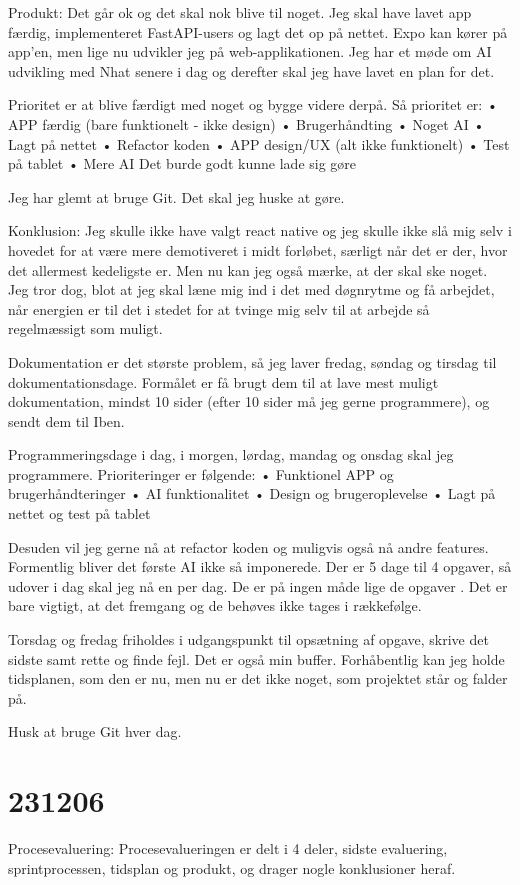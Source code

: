 \documentclass{report}
\begin{document}
Produkt:
Det går ok og det skal nok blive til noget.
Jeg skal have lavet app færdig, implementeret FastAPI-users og lagt det op på nettet.
Expo kan kører på app'en, men lige nu udvikler jeg på web-applikationen.
Jeg har et møde om AI udvikling med Nhat senere i dag og derefter skal jeg have lavet en plan for det.
 
Prioritet er at blive færdigt med noget og bygge videre derpå.
Så prioritet er:
•	APP færdig (bare funktionelt - ikke design)
•	Brugerhåndting
•	Noget AI
•	Lagt på nettet
•	Refactor koden
•	APP design/UX (alt ikke funktionelt)
•	Test på tablet
•	Mere AI
Det burde godt kunne lade sig gøre
 
Jeg har glemt at bruge Git. Det skal jeg huske at gøre.
 
Konklusion:
Jeg skulle ikke have valgt react native og jeg skulle ikke slå mig selv i hovedet for at være mere demotiveret i midt forløbet, særligt når det er der, hvor det allermest kedeligste er.
Men nu kan jeg også mærke, at der skal ske noget.
Jeg tror dog, blot at jeg skal læne mig  ind i det med døgnrytme og få arbejdet, når energien er til det i stedet for at tvinge mig selv til at arbejde så regelmæssigt som muligt.
 
Dokumentation er det største problem, så jeg laver fredag, søndag og tirsdag til dokumentationsdage.
Formålet er få brugt dem til at lave mest muligt dokumentation, mindst 10 sider (efter 10 sider må jeg gerne programmere), og sendt dem til Iben.
 
Programmeringsdage i dag, i morgen, lørdag, mandag og onsdag skal jeg programmere. Prioriteringer er følgende:
•	Funktionel APP og brugerhåndteringer
•	AI funktionalitet
•	Design og brugeroplevelse
•	Lagt på nettet og test på tablet
 
Desuden vil jeg gerne nå at refactor koden og muligvis også nå andre features. Formentlig bliver det første AI ikke så imponerede.
Der er 5 dage til 4 opgaver, så udover i dag skal jeg nå en per dag. De er på ingen måde lige de opgaver . Det er bare vigtigt, at det fremgang og de behøves ikke tages i rækkefølge.
 
Torsdag og fredag friholdes i udgangspunkt til opsætning af opgave, skrive det sidste samt rette og finde fejl.
Det er også min buffer.
Forhåbentlig kan jeg holde tidsplanen, som den er nu, men nu er det ikke noget, som projektet står og falder på.
 
Husk at bruge Git hver dag.

\section{231206}
Procesevaluering:
Procesevalueringen er delt  i 4 deler, sidste evaluering, sprintprocessen, tidsplan og produkt, og drager nogle konklusioner heraf.
\end{document}
